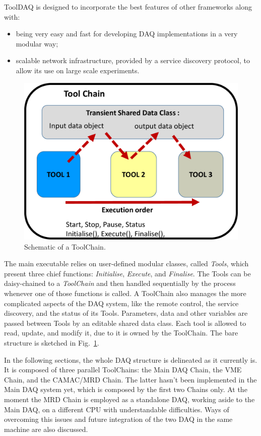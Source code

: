  ToolDAQ is designed to incorporate the best features of other frameworks along with:
 \begin{itemize}
   \item being very easy and fast for developing DAQ implementations in a very %
     modular way;
   \item scalable network infrastructure, provided by a service discovery protocol, to allow %
     its use on large scale experiments.
 \end{itemize}
 
 \begin{figure}
   \centering
   \includegraphics[scale=.13]{pics/pag4richardshkcollaboration}
   \caption{Schematic of a ToolChain.}
   \label{fig:toolchain}
 \end{figure}
 
 The main executable relies on user-defined modular classes, called \emph{Tools}, which 
 present three chief functions: \emph{Initialise}, \emph{Execute}, and \emph{Finalise}.
 The Tools can be daisy-chained to a \emph{ToolChain} and then handled sequentially by the process %
 whenever one of those functions is called.
 A ToolChain also manages the more complicated aspects of the DAQ system, %
 like the remote control, the service discovery, and the status of its Tools.
 Parameters, data and other variables are passed between Tools by an editable shared data class.
 Each tool is allowed to read, update, and modify it, due to it is owned by the ToolChain.
 The bare structure is sketched in Fig.~\ref{fig:toolchain}.
 
 In the following sections, the whole DAQ structure is delineated as it currently is.
 It is composed of three parallel ToolChains: the Main DAQ Chain, the VME Chain, and %
 the CAMAC/MRD Chain.
 The latter hasn't been implemented in the Main DAQ system yet, which is composed by the %
 first two Chains only.
 At the moment the MRD Chain is employed as a standalone DAQ, working aside to %
 the Main DAQ, on a different CPU with understandable difficulties.
 Ways of overcoming this issues and future integration of the two DAQ in the same machine are also discussed.
 

